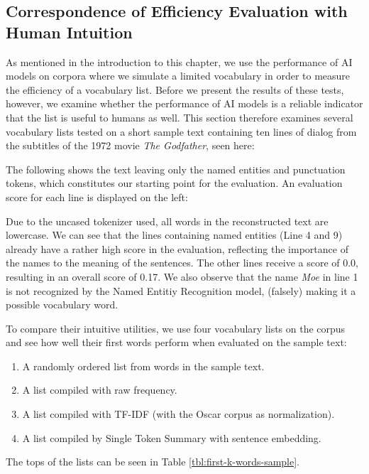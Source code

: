 \subsection{Correspondence of Efficiency Evaluation with Human Intuition} \label{sec:does-eval-correpond-to-intuition}
As mentioned in the introduction to this chapter, we use the performance of AI models on corpora where we simulate a limited vocabulary in order to measure the efficiency of a vocabulary list.
Before we present the results of these tests, however, we examine whether the performance of AI models is a reliable indicator that the list is useful to humans as well.
This section therefore examines several vocabulary lists tested on a short sample text containing ten lines of dialog from the subtitles of the 1972 movie \textit{The Godfather}, seen here:



The following shows the text leaving only the named entities and punctuation tokens, which constitutes our starting point for the evaluation.
An evaluation score for each line is displayed on the left:



Due to the uncased tokenizer used, all words in the reconstructed text are lowercase.
We can see that the lines containing named entities (Line 4 and 9) already have a rather high score in the evaluation, reflecting the importance of the names to the meaning of the sentences.
The other lines receive a score of 0.0, resulting in an overall score of 0.17.
We also observe that the name \textit{Moe} in line 1 is not recognized by the Named Entitiy Recognition model, (falsely) making it a possible vocabulary word.

To compare their intuitive utilities, we use four vocabulary lists on the corpus and see how well their first words perform when evaluated on the sample text:
\begin{enumerate}
	\item A randomly ordered list from words in the sample text.
	\item A list compiled with raw frequency.
	\item A list compiled with TF-IDF (with the Oscar corpus as normalization).
	\item A list compiled by Single Token Summary with sentence embedding.
\end{enumerate}

The tops of the lists can be seen in Table \ref{tbl:first-k-words-sample}.

